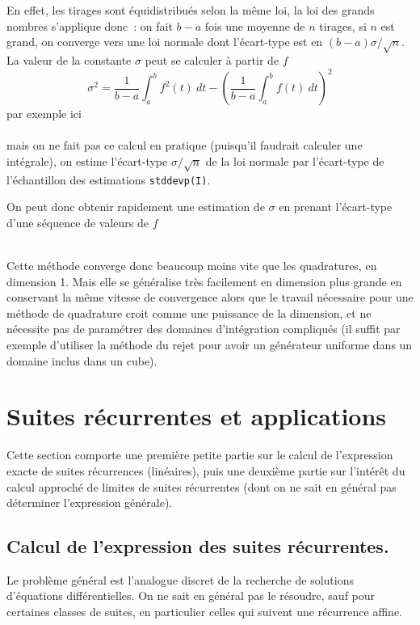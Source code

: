 \documentclass[a4paper,11pt]{article}
\begin{document}
\begin{giacjshere}
En effet, les tirages sont \'equidistribu\'es selon la m\^eme loi,
la loi des grands nombres s'applique donc~: on fait $b-a$ fois
une moyenne de
$n$ tirages, si $n$ est grand, on converge vers une loi normale
dont l'\'ecart-type est en $(b-a)\sigma/\sqrt{n}$.
La valeur de la constante $\sigma$
peut se calculer \`a partir de $f$
$$ \sigma^2 = \frac{1}{b-a}\int_a^b f^2(t) \ dt -
\left( \frac{1}{b-a}\int_a^b f(t) \ dt  \right)^2 $$
par exemple ici\\
\\
mais on ne fait pas ce calcul en pratique
(puisqu'il faudrait calculer une int\'egrale), on estime
l'\'ecart-type $\sigma/\sqrt{n}$ de la loi normale par
l'\'ecart-type de l'\'echantillon des estimations \verb|stddevp(I)|.\\

On peut donc obtenir rapidement une estimation de $\sigma$ en prenant
l'\'ecart-type d'une s\'equence de valeurs de $f$\\
\\

Cette m\'ethode converge donc beaucoup moins vite que les quadratures,
en dimension 1. Mais elle se g\'en\'eralise tr\`es facilement en
dimension plus grande en conservant la m\^eme vitesse de convergence
alors que le travail n\'ecessaire pour une m\'ethode de quadrature
croit comme une puissance de la dimension, et ne n\'ecessite pas
de param\'etrer des domaines d'int\'egration compliqu\'es  (il suffit
par exemple d'utiliser la m\'ethode du rejet pour avoir un
g\'en\'erateur uniforme
dans un domaine inclus dans un cube).


\section{Suites récurrentes et applications} \label{sec:rec}
Cette section comporte une première petite partie sur le calcul
de l'expression exacte de suites récurrences (linéaires), puis
une deuxième partie sur l'intérêt du calcul approché de limites
de suites récurrentes (dont on ne sait en général pas déterminer l'expression
générale).

\subsection{Calcul de l'expression des suites récurrentes.}
Le problème général est l'analogue discret de la recherche de solutions
d'équations différentielles. On ne sait en général pas le résoudre, sauf
pour certaines classes de suites, en particulier celles qui suivent
une récurrence affine.


\end{giacjshere}
\end{document}
